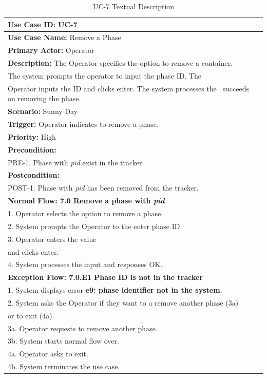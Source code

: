 \begin{table}[h]
\begin{center}
\begin{tabular}{|l|l|}
\hline
\textbf{Use Case ID:} UC-7 \\ \hline
\textbf{Use Case Name:} Remove a Phase \\ \hline
\textbf {Primary Actor:} Operator \\ \hline
\textbf{Description:} The Operator specifies the option to remove a container. \\The system prompts the operator to input the phase ID. The \\Operator inputs the ID and clicks enter. The system processes the \ succeeds on removing the phase. \\ \hline
\textbf{Scenario:} Sunny Day \\ \hline
\textbf{Trigger:} Operator indicates to remove a phase.\\ \hline
\textbf{Priority:} High \\ \hline
\textbf{Precondition:}
\\ PRE-1. Phase with \emph{pid} exist in the tracker.\\ \hline
\textbf{Postcondition:}
\\ POST-1. Phase with \emph{pid} has been removed from the tracker. \\ \hline
\textbf{Normal Flow: 7.0 Remove a phase with \emph{pid}}
\\ 1. Operator selects the option to remove a phase.
\\ 2. System prompts the Operator to the enter phase ID.
\\ 3. Operator enters the value \\and clicks enter.
\\ 4. System processes the input and responses OK.\\ \hline
\textbf{Exception Flow: 7.0.E1 Phase ID is not in the tracker}
\\ 1. System displays error \textbf{e9: phase identifier not in the system}.
\\ 2. System asks the Operator if they want to a remove another phase (3a) \\or to exit (4a).
\\ 3a. Operator requests to remove another phase.
\\ 3b. System starts normal flow over.
\\ 4a. Operator asks to exit.
\\ 4b. System terminates the use case.\\ \hline
\end{tabular}
\end{center}
\caption {UC-7 Textual Description}
\label{tbl:uc7td}
\end{table}


